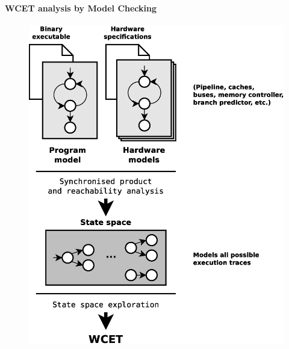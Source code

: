 \documentclass[usenames,dvipsnames]{beamer}
\begin{document}
  \begin{frame}
    \frametitle{\subsecname}
    \framesubtitle{WCET analysis by Model Checking}

    \begin{figure}
      \centering
      \includegraphics[height=.8\textheight]{fig/model-checking}
    \end{figure}
  \end{frame}
\end{document}

